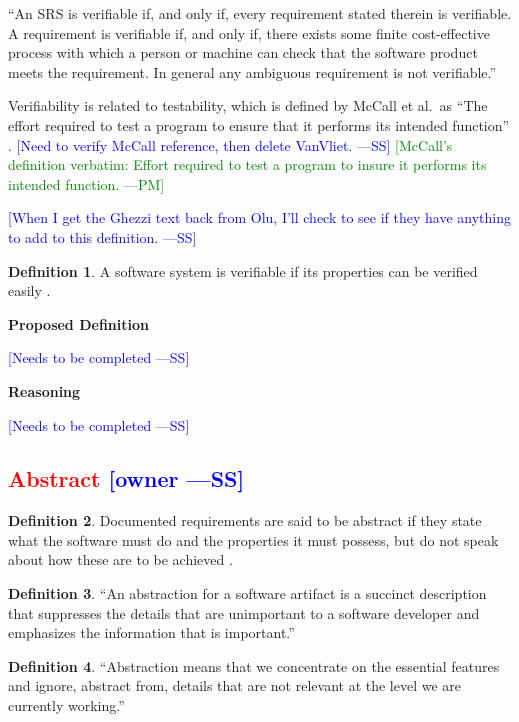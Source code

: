 \documentclass[letterpaper, cleveref]{lipics-v2019}
\newcommand{\authornote}[3]{\textcolor{#1}{[#3 ---#2]}}
\newcommand{\authornote}[3]{}
\newcommand{\wss}[1]{\authornote{blue}{SS}{#1}} %
\newcommand{\pmi}[1]{\authornote{green}{PM}{#1}} %
\newcommand{\notdone}[1]{\textcolor{red}{#1}}
\theoremstyle{definition}
\newtheorem{defn}{Definition}
\begin{document}
``An SRS is verifiable if, and only if, every requirement stated therein is
verifiable. A requirement is verifiable if, and only if, there exists some
finite cost-effective process with which a person or machine can check that the
software product meets the requirement. In general any ambiguous requirement is
not verifiable.'' \citep{IEEE1998}

Verifiability is related to testability, which is defined by McCall et al.\
as ``The effort required to test a program to ensure that it performs its
intended function'' \citep{VanVliet2000}. \wss{Need to verify McCall
reference, then delete VanVliet.} \pmi{McCall's definition verbatim: Effort
required to test a program to insure it performs its intended function.}

\wss{When I get the Ghezzi text back from Olu, I'll check to see if they have
  anything to add to this definition.}

\begin{defn}
  A software system is verifiable if its properties can be verified easily
  \citep{ghezzi1991fundamentals}.
\end{defn}

\noindent \textbf{Proposed Definition} 

\wss{Needs to be completed}

\noindent \textbf{Reasoning}

\wss{Needs to be completed}


\subsection{\notdone{Abstract} \wss{owner}}

\begin{defn}
  Documented requirements are said to be abstract if they state what the
  software must do and the properties it must possess, but do not speak about
  how these are to be achieved \citep{GhezziEtAl2003}.
\end{defn}

\begin{defn}
  ``An abstraction for a software artifact is a succinct description that
  suppresses the details that are unimportant to a software developer and
  emphasizes the information that is important.'' \citep{Krueger1992}
\end{defn}

\begin{defn}
  ``Abstraction means that we concentrate on the essential features and ignore,
  abstract from, details that are not relevant at the level we are currently
  working.''  \citep[p.\ 296]{VanVliet2000}
\end{defn}
\end{document}
